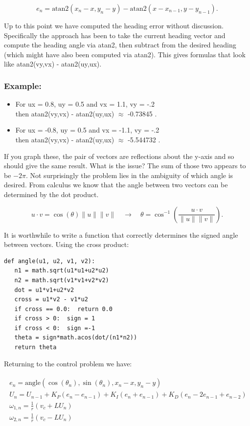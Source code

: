 \[e_n =  \mbox{atan2}( x_n - x , y_n - y) - \mbox{atan2}( x-x_{n-1} , y - y_{n-1}) .\]

Up to this point we have computed the heading error without discussion.
Specifically the approach has been to take the current heading vector
and compute the heading angle via atan2, then subtract from the desired
heading (which might have also been computed via atan2). This gives
formulas that look like atan2(vy,vx) - atan2(uy,ux).

\hypertarget{example}{%
\subsubsection{Example:}\label{example}}

\begin{itemize}
\item
  For ux = 0.8, uy = 0.5 and vx = 1.1, vy = -.2\\
  then atan2(vy,vx) - atan2(uy,ux) \(\approx\) -0.73845 .
\item
  For ux = -0.8, uy = 0.5 and vx = -1.1, vy = -.2\\
  then atan2(vy,vx) - atan2(uy,ux) \(\approx\) -5.544732 .
\end{itemize}

If you graph these, the pair of vectors are reflections about the y-axis
and so should give the same result. What is the issue? The sum of those
two appears to be \(-2\pi\). Not surprisingly the problem lies in the
ambiguity of which angle is desired. From calculus we know that the
angle between two vectors can be determined by the dot product.

\[u \cdot v = \cos(\theta) \| u\| \|v\|  \quad \rightarrow\quad  \theta = \cos^{-1} \left(\frac{u \cdot v }{ \| u\| \|v\|}\right) .\]

It is worthwhile to write a function that correctly determines the
signed angle between vectors. Using the cross product:

\begin{verbatim}
def angle(u1, u2, v1, v2):
   n1 = math.sqrt(u1*u1+u2*u2)
   n2 = math.sqrt(v1*v1+v2*v2)
   dot = u1*v1+u2*v2
   cross = u1*v2 - v1*u2
   if cross == 0.0:  return 0.0
   if cross > 0:  sign = 1
   if cross < 0:  sign =-1
   theta = sign*math.acos(dot/(n1*n2))
   return theta
\end{verbatim}

Returning to the control problem we have:

\[\begin{aligned}
\begin{array}{l}
e_n=  \mbox{angle}( \cos(\theta_n), \sin(\theta_n), x_n - x , y_n - y )\\[3mm]
U_n = U_{n-1} + K_P(e_n - e_{n-1}) + K_I (e_n + e_{n-1}) + K_D (e_n - 2e_{n-1} +e_{n-2})\\[3mm]
\omega_{1,n} = \frac{1}{r} (v_c+LU_n)\\[3mm]
\omega_{2,n} = \frac{1}{r} (v_c-LU_n)
\end{array}
\end{aligned}\]

